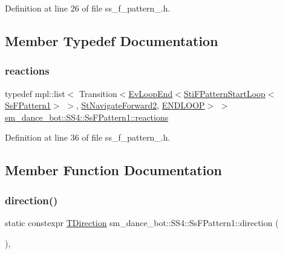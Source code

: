 Definition at line 26 of file ss\+\_\+f\+\_\+pattern\+\_.\+h.



\subsection{Member Typedef Documentation}
\mbox{\label{structsm__dance__bot_1_1SS4_1_1SsFPattern1_a29f0e587dbea2e8668b0851d85f50c54}} 
\subsubsection{\texorpdfstring{reactions}{reactions}}
{\footnotesize\ttfamily typedef mpl\+::list$<$ Transition$<$\hyperlink{structsmacc_1_1default__events_1_1EvLoopEnd}{Ev\+Loop\+End}$<$\hyperlink{structsm__dance__bot_1_1f__pattern__states_1_1StiFPatternStartLoop}{Sti\+F\+Pattern\+Start\+Loop}$<$\hyperlink{structsm__dance__bot_1_1SS4_1_1SsFPattern1}{Ss\+F\+Pattern1}$>$ $>$, \hyperlink{structsm__dance__bot_1_1StNavigateForward2}{St\+Navigate\+Forward2}, \hyperlink{structsmacc_1_1default__transition__tags_1_1ENDLOOP}{E\+N\+D\+L\+O\+OP}$>$ $>$ \hyperlink{structsm__dance__bot_1_1SS4_1_1SsFPattern1_a29f0e587dbea2e8668b0851d85f50c54}{sm\+\_\+dance\+\_\+bot\+::\+S\+S4\+::\+Ss\+F\+Pattern1\+::reactions}}



Definition at line 36 of file ss\+\_\+f\+\_\+pattern\+\_.\+h.



\subsection{Member Function Documentation}
\mbox{\label{structsm__dance__bot_1_1SS4_1_1SsFPattern1_a4d286cea10dd7a14743a89f5a2131dc5}} 
\subsubsection{\texorpdfstring{direction()}{direction()}}
{\footnotesize\ttfamily static constexpr \hyperlink{namespacesm__dance__bot_1_1f__pattern__states_acc99b72745466e5dcee9272425a34e58}{T\+Direction} sm\+\_\+dance\+\_\+bot\+::\+S\+S4\+::\+Ss\+F\+Pattern1\+::direction (\begin{DoxyParamCaption}{ }\end{DoxyParamCaption})\hspace{0.3cm}{\ttfamily [inline]}, {\ttfamily [static]}}



